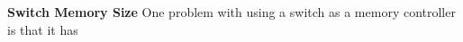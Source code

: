\textbf{Switch Memory Size}
One problem with using a switch as a memory controller is that it has


\pagebreak




